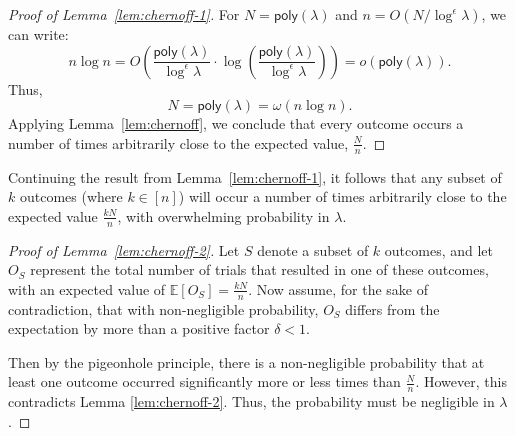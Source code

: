 \begin{proof}[Proof of Lemma~\ref{lem:chernoff-1}]

For $N = \mathsf{poly}(\lambda)$ and $n = O(N / \log^\epsilon \lambda)$, we can write:
$$
n \log n = O\left(\frac{\mathsf{poly}(\lambda)}{\log^\epsilon \lambda} \cdot \log\left(\frac{\mathsf{poly}(\lambda)}{\log^\epsilon \lambda}\right)\right) = o(\mathsf{poly}(\lambda)).
$$
Thus,
$$
N = \mathsf{poly}(\lambda) = \omega(n \log n).
$$
Applying Lemma~\ref{lem:chernoff}, we conclude that every outcome occurs a number of times arbitrarily close to the expected value, $\frac{N}{n}$. 
\end{proof}

\begin{lemma} \label{lem:chernoff-2} Continuing the result from Lemma~\ref{lem:chernoff-1}, it follows that any subset of $k$ outcomes (where $k \in [n]$) will occur a number of times arbitrarily close to the expected value $\frac{kN}{n}$, with overwhelming probability in $\lambda$.
\end{lemma} 

\begin{proof}[Proof of Lemma~\ref{lem:chernoff-2}]
Let $S$ denote a subset of $k$ outcomes, and let $O_S$ represent the total number of trials that resulted in one of these outcomes, with an expected value of $\mathbb{E}[O_S] = \frac{kN}{n}$. Now assume, for the sake of contradiction, that with non-negligible probability, $O_S$ differs from the expectation by more than a positive factor $\delta < 1$.

Then by the pigeonhole principle, there is a non-negligible probability that at least one outcome occurred significantly more or less times than $\frac{N}{n}$. However, this contradicts Lemma \ref{lem:chernoff-2}. Thus, the probability must be negligible in $\lambda$.
\end{proof}

